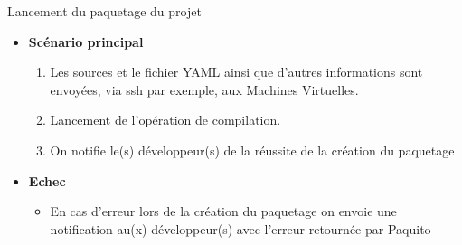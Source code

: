 \documentclass[9pt,xcolor=dvipsnames]{beamer}
\begin{document}
\begin{frame}{Lancement du paquetage du projet}
\begin{minipage}{0.50\textwidth}
\begin{flushright}
\begin{itemize}
      \item \textbf{Scénario principal}
        \begin{enumerate}
        \item Les sources et le fichier YAML ainsi que d'autres informations sont envoyées, via ssh par exemple, aux Machines Virtuelles.
        \item Lancement de l'opération de compilation.
        \item On notifie le(s) développeur(s) de la réussite de la création du paquetage
        \end{enumerate}
      \item \textbf{Echec}
        \begin{itemize}
        \item En cas d'erreur lors de la création du paquetage on envoie une notification au(x) développeur(s) avec l'erreur retournée par Paquito
        \end{itemize}
      \end{itemize}
    \end{flushright}
  \end{minipage}
\end{frame}
\end{document}
